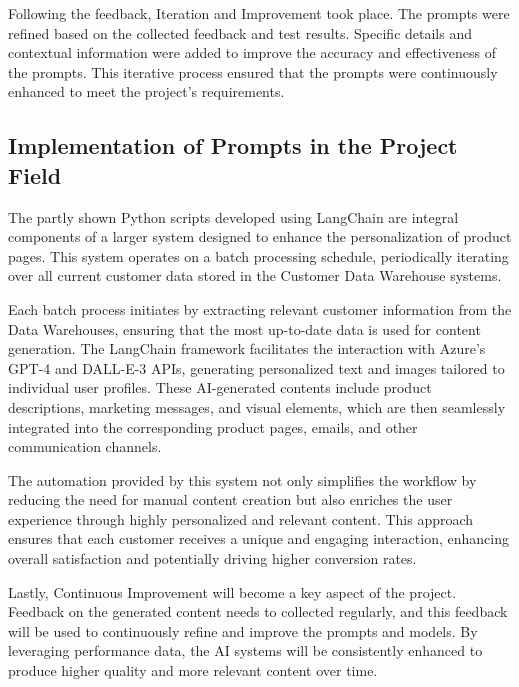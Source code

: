 \documentclass[%
pdftex,
oneside,			%
11pt,				%
parskip=half,		%
headheight = 12pt,	%
headsepline,		%
footsepline,		%
footheight = 16pt,	%
abstracton,		%
DIV=calc,		%
BCOR=8mm,		%
headinclude=false,	%
footinclude=false,	%
listof=totoc,		%
toc=bibliography,	%
]{scrreprt}	%
\begin{document}
            Following the feedback, Iteration and Improvement took place. 
            The prompts were refined based on the collected feedback and test results. 
            Specific details and contextual information were added to improve the accuracy and effectiveness of the prompts. 
            This iterative process ensured that the prompts were continuously enhanced to meet the project's requirements.


        \subsection{Implementation of Prompts in the Project Field}

            The partly shown Python scripts developed using LangChain are integral components of a larger system designed to enhance the personalization of product pages.
            This system operates on a batch processing schedule, periodically iterating over all current customer data stored in the Customer Data Warehouse systems. 

            Each batch process initiates by extracting relevant customer information from the Data Warehouses, ensuring that the most up-to-date data is used for content generation. 
            The LangChain framework facilitates the interaction with Azure's GPT-4 and DALL-E-3 APIs, generating personalized text and images tailored to individual user profiles. 
            These AI-generated contents include product descriptions, marketing messages, and visual elements, which are then seamlessly integrated into the corresponding product pages, emails, and other communication channels.

            The automation provided by this system not only simplifies the workflow by reducing the need for manual content creation but also enriches the user experience through highly personalized and relevant content. 
            This approach ensures that each customer receives a unique and engaging interaction, enhancing overall satisfaction and potentially driving higher conversion rates.
            
            Lastly, Continuous Improvement will become a key aspect of the project. 
            Feedback on the generated content needs to collected regularly, and this feedback will be used to continuously refine and improve the prompts and models. 
            By leveraging performance data, the AI systems will be consistently enhanced to produce higher quality and more relevant content over time.
\end{document}
